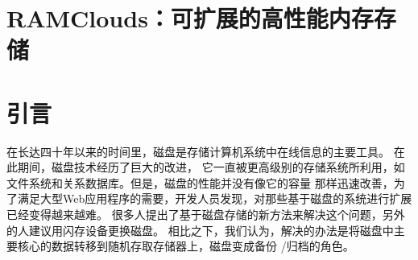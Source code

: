 \documentclass[translation]{zjutreport}
\begin{document}


\frontmatter %

\begingroup %
\let\clearpage\relax %



\titleformat{\chapter}[block]{\sihao\heiti\filcenter\bfseries}{\CJKnumber{\thechapter}}{1ex}{}{} %
\chapter*{RAMClouds：可扩展的高性能内存存储}
{} %





\mainmatter%
\chapter{引言}
在长达四十年以来的时间里，磁盘是存储计算机系统中在线信息的主要工具。
在此期间，磁盘技术经历了巨大的改进，
它一直被更高级别的存储系统所利用，如文件系统和关系数据库。但是，磁盘的性能并没有像它的容量
那样迅速改善，为了满足大型Web应用程序的需要，开发人员发现，对那些基于磁盘的系统进行扩展
已经变得越来越难。
很多人提出了基于磁盘存储的新方法来解决这个问题，另外的人建议用​​闪存设备更换磁盘。
相比之下，我们认为，解决的办法是将磁盘中主要核心的数据转移到随机存取存储器上，磁盘变成备份
/归档的角色。
\end{document}
